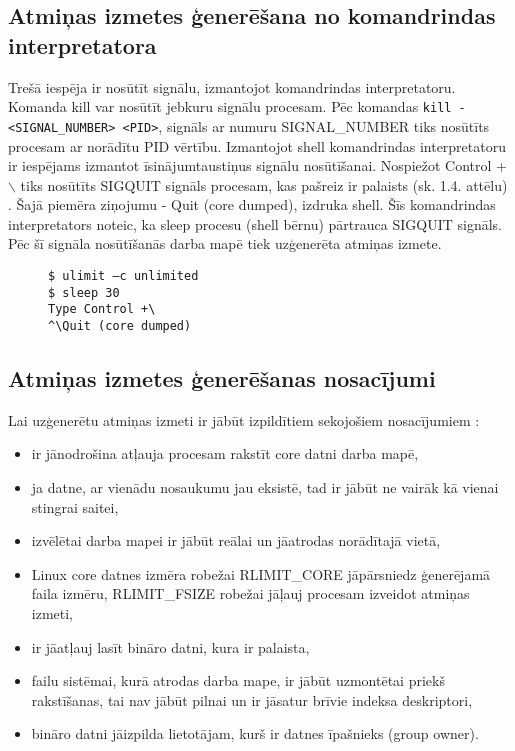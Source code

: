 \subsection{Atmiņas izmetes ģenerēšana no komandrindas interpretatora}
Trešā iespēja ir nosūtīt signālu, izmantojot komandrindas interpretatoru. 
Komanda kill var nosūtīt jebkuru signālu procesam.
Pēc komandas  \texttt{kill -<SIGNAL\_NUMBER> <PID>}, signāls ar numuru  SIGNAL\_NUMBER tiks nosūtīts procesam ar norādītu PID vērtību.
Izmantojot shell komandrindas interpretatoru ir  iespējams izmantot īsinājumtaustiņus signālu nosūtīšanai. 
Nospiežot Control + $\backslash$ tiks nosūtīts SIGQUIT signāls procesam, kas pašreiz ir palaists (sk. 1.4. attēlu) \cite {nosacijumi}. 
Šajā piemēra ziņojumu - Quit (core dumped), izdruka shell. 
Šīs komandrindas interpretators noteic, ka  sleep procesu (shell bērnu) pārtrauca SIGQUIT signāls. 
Pēc šī signāla nosūtīšanās darba mapē tiek uzģenerēta atmiņas izmete. 

\begin{figure}[h]
\begin{lstlisting}
$ ulimit –c unlimited
$ sleep 30
Type Control +\
^\Quit (core dumped)
\end{lstlisting}
\caption{\textbf{\fontsize{11}{12}\selectfont {Atmiņas izmetes ģenerēšana, izmantojot īsinājumtaustiņus}}}
\end{figure}

\subsection{Atmiņas izmetes ģenerēšanas nosacījumi}
Lai  uzģenerētu atmiņas izmeti ir jābūt izpildītiem sekojošiem nosacījumiem \cite {nosacijumi}:
\begin{itemize}
	\item   ir jānodrošina atļauja procesam rakstīt core datni darba mapē,
	\item 	ja datne, ar vienādu nosaukumu jau eksistē, tad ir jābūt ne vairāk kā vienai stingrai saitei, 
	\item 	izvēlētai darba mapei ir jābūt reālai un jāatrodas norādītajā vietā, 
	\item 	Linux core datnes izmēra robežai {RLIMIT\_CORE} jāpārsniedz ģenerējamā faila izmēru, { RLIMIT\_FSIZE} robežai jāļauj procesam izveidot atmiņas izmeti,
	\item 	ir  jāatļauj lasīt bināro datni, kura ir palaista,
	\item 	failu sistēmai, kurā atrodas darba mape, ir jābūt uzmontētai priekš rakstīšanas, tai nav jābūt pilnai un ir jāsatur brīvie indeksa deskriptori,
	\item 	bināro datni jāizpilda lietotājam, kurš ir datnes īpašnieks (group owner).
\end{itemize} 
 
